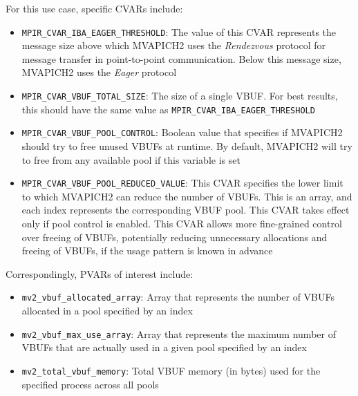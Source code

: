 For this use case, specific CVARs include:
\begin{itemize}
  \item \verb+MPIR_CVAR_IBA_EAGER_THRESHOLD+: The value of this CVAR represents the message size above which MVAPICH2 uses the \emph{Rendezvous} protocol for message transfer in point-to-point communication. Below this message size, MVAPICH2 uses the \emph{Eager} protocol
  \item \verb+MPIR_CVAR_VBUF_TOTAL_SIZE+: The size of a single VBUF. For best results, this should have the same value as \verb+MPIR_CVAR_IBA_EAGER_THRESHOLD+
  \item \verb+MPIR_CVAR_VBUF_POOL_CONTROL+: Boolean value that specifies if MVAPICH2 should try to free unused VBUFs at runtime. By default, MVAPICH2 will try to free from any available pool if this variable is set
  \item \verb+MPIR_CVAR_VBUF_POOL_REDUCED_VALUE+: This CVAR specifies the lower limit to which MVAPICH2 can reduce the number of VBUFs. This is an array, and each index represents the corresponding VBUF pool. This CVAR takes effect only if  pool control is enabled. This CVAR allows more fine-grained control over freeing of VBUFs, potentially reducing unnecessary allocations and freeing of VBUFs, if the usage pattern is known in advance
\end{itemize}

Correspondingly, PVARs of interest include:
\begin{itemize}
  \item \verb+mv2_vbuf_allocated_array+: Array that represents the number of VBUFs allocated in a pool specified by an index
  \item \verb+mv2_vbuf_max_use_array+: Array that represents the maximum number of VBUFs that are actually used in a given pool specified by an index
  \item \verb+mv2_total_vbuf_memory+: Total VBUF memory (in bytes) used for the specified process across all pools
\end{itemize}

